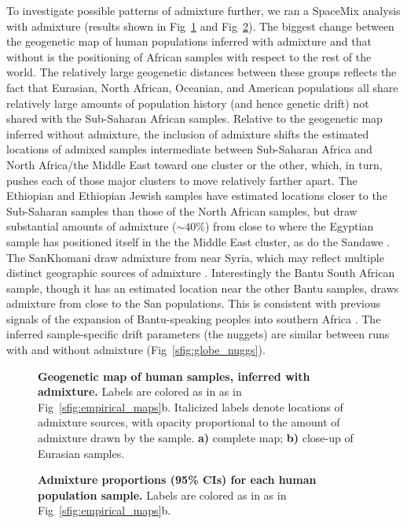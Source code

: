 \documentclass[10pt,letterpaper]{article}
\begin{document}
To investigate possible patterns of admixture further, we ran a SpaceMix analysis with admixture (results shown in Fig\ \ref{sfig:globe_ad_maps} and Fig\ \ref{globe_ad_props}). The biggest change between the geogenetic map of human populations inferred with admixture and that without is the positioning of African samples with respect to the rest of the world.  The relatively large geogenetic distances between these groups reflects the fact that Eurasian, North African, Oceanian, and American populations all share relatively large amounts of population history (and hence genetic drift) not shared with the Sub-Saharan African samples. Relative to the geogenetic map inferred without admixture, the inclusion of admixture shifts the estimated locations of admixed samples intermediate between Sub-Saharan Africa and North Africa/the Middle East toward one cluster or the other, which, in turn, pushes each of those major clusters to move relatively farther apart.  The Ethiopian and Ethiopian Jewish samples have estimated locations closer to the Sub-Saharan samples than those of the North African samples, but draw substantial amounts of admixture ($\sim 40\%$) from close to where the Egyptian sample has positioned itself in the the Middle East cluster, as do the Sandawe \cite{hodgson_early_2014,Pickrell:12}. 
The SanKhomani draw admixture from near Syria, which may reflect multiple distinct geographic sources of admixture \cite{Hellenthal,Pickrell:14}. 
Interestingly the Bantu South African sample, though it has an estimated location near the other Bantu samples, draws admixture from close to the San populations. This is consistent with previous signals of the expansion of Bantu-speaking peoples into southern Africa  \cite{Pickrell:12,Jakobsson_genomic_2012,Pickrell:14,Hellenthal}.  The inferred sample-specific drift parameters (the nuggets) are similar between runs with and without admixture (Fig\ \ref{sfig:globe_nuggs}).
%
\begin{figure}[ht!]
\begin{center}
\end{center}
\caption{
\textbf{Geogenetic map of human samples, inferred with admixture.} 
Labels are colored as in as in Fig\ \ref{sfig:empirical_maps}b.
Italicized labels denote locations of admixture sources, 
with opacity proportional to the amount of admixture drawn by the sample.
	\textbf{a)} complete map; 
	\textbf{b)} close-up of Eurasian samples.
}\label{sfig:globe_ad_maps}
\end{figure}
%
\begin{figure}[ht!]
\begin{center}
\end{center}
\caption{
\textbf{Admixture proportions (95\% CIs) for each human population sample.}
Labels are colored as in as in Fig\ \ref{sfig:empirical_maps}b.
}\label{globe_ad_props}
\end{figure}
\end{document}
